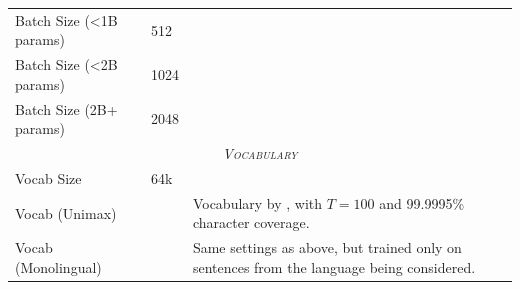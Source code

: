 \begin{table}[ht]
\begin{tabular}{l | l | p{8cm}}
        Batch Size (<1B params) & 512 &  \\
        Batch Size (<2B params) & 1024 &  \\
        Batch Size (2B+ params) & 2048 &  \\
        \midrule
        \multicolumn{3}{c}{\textsc{\emph{Vocabulary}}} \\
        \midrule
        Vocab Size & 64k &  \\
        Vocab (Unimax) & & Vocabulary by \citeauthor{kudugunta2024madlad}, with $T=100$ and 99.9995\% character coverage. \\
        Vocab (Monolingual) & &  Same settings as above, but trained only on sentences from the language being considered. \\
        \bottomrule
    \end{tabular}
    \label{tab:pretrain-hyperparams}
\end{table}
\endgroup
